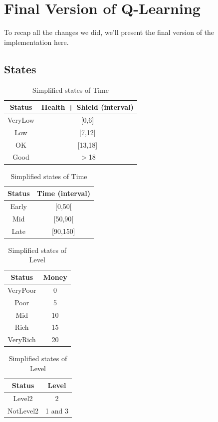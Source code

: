 \documentclass{article}
\begin{document}
  \section{Final Version of Q-Learning}

  To recap all the changes we did, we'll present the final version of the implementation here.

  \subsection{States}

  \begin{table}[h!]
    \parbox{.45\linewidth}{
      \centering
      \caption{Simplified states of Health}
      \label{tab:healthStates2}
      \begin{tabular}{c|c}
        \textbf{Status} & \textbf{Health + Shield (interval)}\\
        \hline
        VeryLow & [0,6]\\
        Low & [7,12]\\
        OK & [13,18]\\
        Good & $>$18\\
      \end{tabular}
    }
    \hfil
    \parbox{.45\linewidth}{
      \centering
      \caption{Simplified states of Time}
      \label{tab:timeStates2}
      \begin{tabular}{c|c}
        \textbf{Status} & \textbf{Time (interval)}\\
        \hline
        Early  & [0,50[\\
        Mid & [50,90[\\
        Late & [90,150]\\
      \end{tabular}
    }
  \end{table}
  \begin{table}[h!]
    \parbox{.45\linewidth}{
      \centering
      \caption{Simplified states of Money}
      \label{tab:moneyStates3}
      \begin{tabular}{c|c}
        \textbf{Status} & \textbf{Money}\\
        \hline
        VeryPoor & 0\\
        Poor & 5\\
        Mid & 10\\
        Rich &  15\\
        VeryRich & 20\\
      \end{tabular}
    }
    \hfil
    \parbox{.45\linewidth}{
      \centering
      \caption{Simplified states of Level}
      \label{tab:levelStates2}
      \begin{tabular}{c|c}
        \textbf{Status} & \textbf{Level}\\
        \hline
        Level2 & 2\\
        NotLevel2 & 1 and 3\\
      \end{tabular}
    }
  \end{table}
\end{document}
